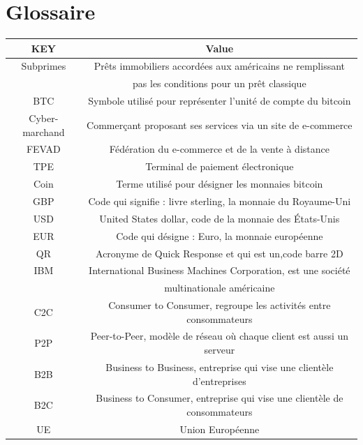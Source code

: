 \documentclass[12pt]{report}
\begin{document}
\section{Glossaire}
\begin{tabular}{|c|c|}
\hline 
\rowcolor{green}KEY & Value \\

\hline
Subprimes & Prêts immobiliers accordées aux américains ne remplissant \\ & pas les conditions pour un prêt classique \\ 

\hline 
BTC & Symbole utilisé pour représenter l'unité de compte du bitcoin \\

\hline
Cyber-marchand & Commerçant proposant ses services via un site de e-commerce \\

\hline
FEVAD & Fédération du e-commerce et de la vente à distance\\

\hline
TPE & Terminal de paiement électronique\\

\hline
Coin & Terme utilisé pour désigner les monnaies bitcoin\\

\hline
GBP & Code qui signifie : livre sterling, la monnaie du Royaume-Uni\\

\hline
USD & United States dollar, code de la monnaie des États-Unis \\

\hline
EUR & Code qui désigne : Euro, la monnaie européenne \\

\hline
QR & Acronyme de Quick Response et qui est un,code barre 2D\\

\hline
IBM & International Business Machines Corporation, est une société \\ & multinationale américaine\\

\hline
C2C & Consumer to Consumer, regroupe les activités entre consommateurs\\  

\hline
P2P & Peer-to-Peer, modèle de réseau où chaque client est aussi un serveur\\

\hline
B2B & Business to Business, entreprise qui vise une clientèle d'entreprises\\

\hline
B2C & Business to Consumer, entreprise qui vise une clientèle de consommateurs\\

\hline
UE & Union Européenne \\

\hline 
\end{tabular} 
\end{document}
